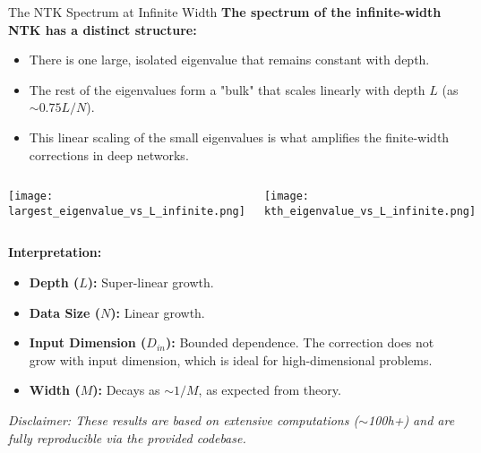\documentclass{beamer}
\begin{document}
\begin{frame}{The NTK Spectrum at Infinite Width}
\textbf{The spectrum of the infinite-width NTK has a distinct structure:}
\begin{itemize}
    \item There is one large, isolated eigenvalue that remains constant with depth.
    \item The rest of the eigenvalues form a "bulk" that scales linearly with depth $L$ (as $\sim 0.75 L/N$).
    \item This linear scaling of the small eigenvalues is what amplifies the finite-width corrections in deep networks.
\end{itemize}

\begin{columns}[T] %
    \texttt{[image: largest\_eigenvalue\_vs\_L\_infinite.png]}

    \texttt{[image: kth\_eigenvalue\_vs\_L\_infinite.png]}
\end{columns}

\textbf{Interpretation:}
\begin{itemize}
    \item \textbf{Depth ($L$):} Super-linear growth.
    \item \textbf{Data Size ($N$):} Linear growth.
    \item \textbf{Input Dimension ($D_{in}$):} Bounded dependence. The correction does not grow with input dimension, which is ideal for high-dimensional problems.
    \item \textbf{Width ($M$):} Decays as $\sim 1/M$, as expected from theory.
\end{itemize}

\vfill
\tiny{\textit{Disclaimer: These results are based on extensive computations ($\sim$100h+) and are fully reproducible via the provided codebase.}}

\end{frame}
\end{document}
